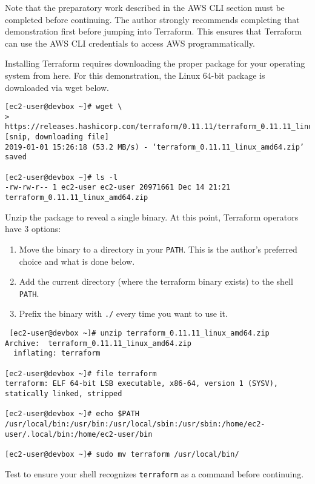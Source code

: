 Note that the preparatory work described in the AWS CLI section must be
completed before continuing. The author strongly recommends completing that
demonstration first before jumping into Terraform. This ensures that Terraform
can use the AWS CLI credentials to access AWS programmatically.

Installing Terraform requires downloading the proper package for your
operating system from here. For this demonstration, the Linux 64-bit package
is downloaded via wget below.

\begin{verbatim}
[ec2-user@devbox ~]# wget \
>  https://releases.hashicorp.com/terraform/0.11.11/terraform_0.11.11_linux_amd64.zip
[snip, downloading file]
2019-01-01 15:26:18 (53.2 MB/s) - ‘terraform_0.11.11_linux_amd64.zip’ saved

[ec2-user@devbox ~]# ls -l
-rw-rw-r-- 1 ec2-user ec2-user 20971661 Dec 14 21:21 terraform_0.11.11_linux_amd64.zip
\end{verbatim}

Unzip the package to reveal a single binary. At this point, Terraform
operators have 3 options:

\begin{enumerate}
  \item	Move the binary to a directory in your \verb|PATH|. This is the
  author's preferred choice and what is done below.
  \item	Add the current directory (where the terraform binary exists) to the
  shell \verb|PATH|.
  \item	Prefix the binary with \verb|./| every time you want to use it.
\end{enumerate}

\begin{verbatim}
 [ec2-user@devbox ~]# unzip terraform_0.11.11_linux_amd64.zip
Archive:  terraform_0.11.11_linux_amd64.zip
  inflating: terraform

[ec2-user@devbox ~]# file terraform
terraform: ELF 64-bit LSB executable, x86-64, version 1 (SYSV), statically linked, stripped

[ec2-user@devbox ~]# echo $PATH
/usr/local/bin:/usr/bin:/usr/local/sbin:/usr/sbin:/home/ec2-user/.local/bin:/home/ec2-user/bin

[ec2-user@devbox ~]# sudo mv terraform /usr/local/bin/
\end{verbatim}

Test to ensure your shell recognizes \verb|terraform| as a command before continuing.

